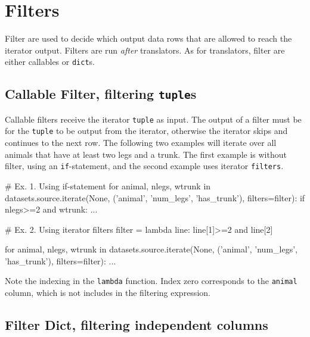 \section{Filters}
\label{sec:filters}

Filter are used to decide which output data rows that are allowed to
reach the iterator output.  Filters are run \emph{after} translators.
As for translators, filter are either callables or \texttt{dict}s.




\subsection*{Callable Filter, filtering \texttt{tuple}s}

Callable filters receive the iterator \texttt{tuple} as input.  The
output of a filter must be \pyTrue for the \texttt{tuple} to be output
from the iterator, otherwise the iterator skips and continues to the
next row.  The following two examples will iterate over all animals
that have at least two legs and a trunk.  The first example is without
filter, using an \texttt{if}-statement, and the second example uses
iterator \texttt{filters}.
\begin{python}
# Ex. 1. Using if-statement
for animal, nlegs, wtrunk in datasets.source.iterate(None,
        ('animal', 'num_legs', 'has_trunk'), filters=filter):
        if nlegs>=2 and wtrunk:
    ...

# Ex. 2.  Using iterator filters
filter = lambda line: line[1]>=2 and line[2]

for animal, nlegs, wtrunk in datasets.source.iterate(None,
        ('animal', 'num_legs', 'has_trunk'), filters=filter):
    ...
\end{python}
Note the indexing in the \texttt{lambda} function.  Index zero
corresponds to the \texttt{animal} column, which is not includes in
the filtering expression.



\subsection*{Filter Dict, filtering independent columns}

